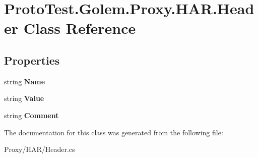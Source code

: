 \hypertarget{class_proto_test_1_1_golem_1_1_proxy_1_1_h_a_r_1_1_header}{\section{Proto\-Test.\-Golem.\-Proxy.\-H\-A\-R.\-Header Class Reference}
\label{class_proto_test_1_1_golem_1_1_proxy_1_1_h_a_r_1_1_header}
}
\subsection*{Properties}
\begin{DoxyCompactItemize}
\item 
\hypertarget{class_proto_test_1_1_golem_1_1_proxy_1_1_h_a_r_1_1_header_a3f622d9a15acbf58fa2d2742ec9bdb54}{string {\bfseries Name}}\label{class_proto_test_1_1_golem_1_1_proxy_1_1_h_a_r_1_1_header_a3f622d9a15acbf58fa2d2742ec9bdb54}

\item 
\hypertarget{class_proto_test_1_1_golem_1_1_proxy_1_1_h_a_r_1_1_header_a46b78f94da68430688d04d685decc032}{string {\bfseries Value}}\label{class_proto_test_1_1_golem_1_1_proxy_1_1_h_a_r_1_1_header_a46b78f94da68430688d04d685decc032}

\item 
\hypertarget{class_proto_test_1_1_golem_1_1_proxy_1_1_h_a_r_1_1_header_ae5915d4de0d44d639bbef4dc06d0a273}{string {\bfseries Comment}}\label{class_proto_test_1_1_golem_1_1_proxy_1_1_h_a_r_1_1_header_ae5915d4de0d44d639bbef4dc06d0a273}

\end{DoxyCompactItemize}


The documentation for this class was generated from the following file\-:\begin{DoxyCompactItemize}
\item 
Proxy/\-H\-A\-R/Header.\-cs\end{DoxyCompactItemize}
